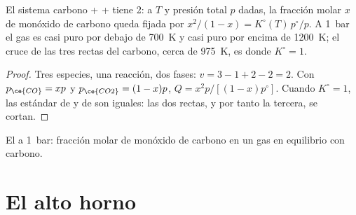 \begin{proposition}\label{prop:b2:ellingham:boudouard}
El sistema carbono +  +  tiene  2: a $T$ y presión total
$p$ dadas, la fracción molar $x$ de monóxido de carbono queda fijada por $x^2/(1 - x)
= K^\circ(T)\,p^\circ/p$. A \qty{1}{bar} el gas es casi  puro
por debajo de \qty{700}{K} y casi  puro por encima de \qty{1200}{K}; el cruce de
las tres rectas del carbono, cerca de \qty{975}{K}, es donde $K^\circ = 1$.
\end{proposition}

\begin{proof}
Tres especies, una reacción, dos fases: $v = 3 - 1 + 2 - 2 = 2$. Con $p_{\ce{CO}}
= xp$ y $p_{\ce{CO2}} = (1 - x)p$, $Q = x^2p/[(1 - x)p^\circ]$. Cuando $K^\circ = 1$,
las  estándar de  y de  son
iguales: las dos rectas, y por tanto la tercera, se cortan.
\end{proof}

\begin{omfigure}

{\small El  a \qty{1}{bar}: fracción molar de monóxido
de carbono en un gas en equilibrio con carbono.}
\end{omfigure}

\section{El alto horno}

